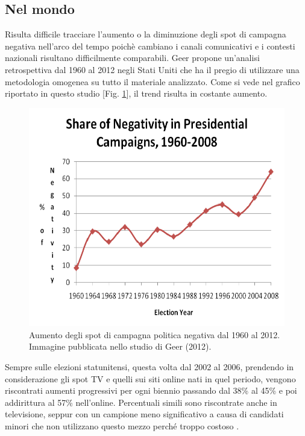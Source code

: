 \subsection{Nel mondo}
Risulta difficile tracciare l'aumento o la diminuzione degli spot di campagna negativa nell'arco del tempo poichè cambiano i canali comunicativi e i contesti nazionali risultano difficilmente comparabili.
Geer propone un'analisi retrospettiva dal 1960 al 2012 \citep{geer2012} negli Stati Uniti che ha il pregio di utilizzare una metodologia omogenea su tutto il materiale analizzato. Come si vede nel grafico riportato in questo studio [Fig. \ref{fig:negativa}], il trend risulta in costante aumento.
\begin{figure}
	\includegraphics[width=\textwidth]{figures/negativa}
	\caption{Aumento degli spot di campagna politica negativa dal 1960 al 2012. Immagine pubblicata nello studio di Geer (2012).}
	\label{fig:negativa}
\end{figure}

Sempre sulle elezioni statunitensi, questa volta dal 2002 al 2006, prendendo in considerazione gli spot TV e quelli sui siti online nati in quel periodo, vengono riscontrati aumenti progressivi per ogni biennio passando  dal 38\%  al 45\% e poi addirittura al 57\% nell'online. Percentuali simili sono riscontrate anche in televisione, seppur con un campione meno significativo a causa di candidati minori che non utilizzano questo mezzo perché troppo costoso \citep{druckman2010}.

